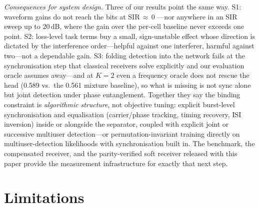 \documentclass[review,12pt]{elsarticle}
\begin{document}
\emph{Consequences for system design.} Three of our results point the
same way. S1: waveform gains do not reach the bits at SIR$\,\approx\,$0
---nor anywhere in an SIR sweep up to $20$\,dB, where the gain over the
per-cell baseline never exceeds one point. S2: loss-level task terms
buy a small, sign-unstable effect whose
direction is dictated by the interference order---helpful against one
interferer, harmful against two---not a dependable gain. S3: folding
detection into the
network fails at the synchronisation step that classical receivers solve
explicitly and our evaluation oracle assumes away---and at $K{=}2$ even
a frequency oracle does not rescue the head (0.589 vs.\ the 0.561
mixture baseline), so what is missing is not sync alone but joint
detection under phase entanglement. Together they say the
binding constraint is \emph{algorithmic structure}, not objective
tuning: explicit burst-level synchronisation and equalisation
(carrier/phase tracking, timing recovery, ISI inversion) inside or
alongside the separator, coupled with explicit joint or successive
multiuser detection---or permutation-invariant training directly on
multiuser-detection likelihoods with synchronisation built in. The
benchmark, the compensated receiver, and the parity-verified soft
receiver released with this paper provide the measurement infrastructure
for exactly that next step.

\section{Limitations}
\label{sec:limit}
\end{document}
